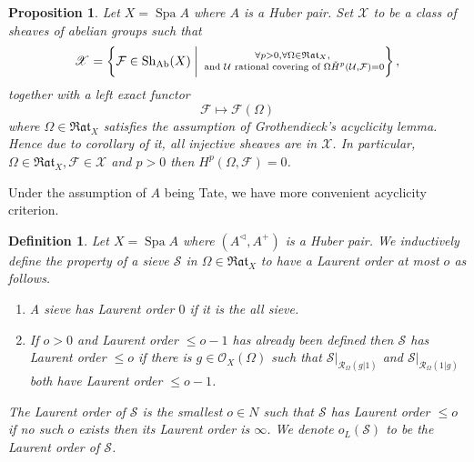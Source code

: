 \documentclass[8pt]{article}
\numberwithin{equation}{section}
\newtheorem{proposition}{Proposition}[subsection]
\newtheorem{definition}{Definition}[subsection]
\DeclareMathOperator{\Spa}{Spa}
\newcommand{\cR}[0]{\mathcal{R}}
\newcommand{\sS}[0]{\mathscr{S}}
\newcommand{\cO}[0]{\mathcal{O}}
\newcommand{\cF}[0]{\mathcal{F}}
\newcommand{\Rat}[0]{\mathfrak{Rat}}
\begin{document}
\begin{proposition}
    Let $X=\Spa A$ where $A$ is a Huber pair. Set $\mathscr{X}$ to be a class of sheaves of abelian groups such that 
    \begin{equation*}
    \mathscr{X} = \left\{\cF\in\mathrm{Sh}_{\mathrm{Ab}}(X)\:\bigg{\vert}\:\substack{\forall p>0, \forall \Omega\in\Rat_X, \\\text{ and $\mathcal{U}$ rational covering of $\Omega$} \check{H}^p(\mathcal{U},\mathcal{F}) = 0}\right\},
    \end{equation*} %
    together with a left exact functor
    \begin{equation*}
        \mathcal{F}\mapsto\mathcal{F}(\Omega)
    \end{equation*}
    where $\Omega\in\Rat_X$ satisfies the assumption of Grothendieck's acyclicity lemma. Hence due to corollary of it, all injective sheaves are in $\mathscr{X}$. In particular, $\Omega\in\Rat_X,\mathcal{F}\in\mathscr{X}$ and $p>0$ then $H^p(\Omega,\mathcal{F})=0$.
\end{proposition}


Under the assumption of $A$ being Tate, we have more convenient acyclicity criterion.

\begin{definition}
    \label{definition_24_2}
    Let $X=\Spa A$ where $(A^\triangleleft,A^+)$ is a Huber pair. We inductively define the property of a sieve $\sS$ in $\Omega\in\Rat_X$ to have a Laurent order at most $o$ as follows.
    \begin{enumerate}
        \item A sieve has Laurent order $0$ if it is the all sieve.
        \item If $o>0$ and Laurent order $\leq o-1$ has already been defined then $\sS$ has Laurent order $\leq o$ if there is $g\in \cO_X(\Omega)$ such that $\sS|_{\cR_\Omega(g|1)}$ and $\sS|_{\cR_\Omega(1|g)}$ both have Laurent order $\leq o-1$. 
    \end{enumerate}
    The Laurent order of $\sS$ is the smallest $o\in N$ such that $\sS$ has Laurent order $\leq o$ if no such $o$ exists then its Laurent order is $\infty$. We denote $o_L(\sS)$ to be the Laurent order of $\sS$.
\end{definition}
\end{document}
